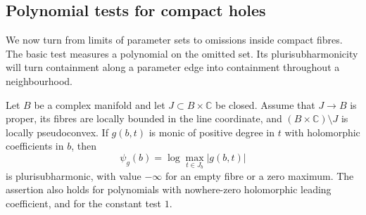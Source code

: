 \subsection{Polynomial tests for compact holes}

We now turn from limits of parameter sets to omissions inside compact
fibres. The basic test measures a polynomial on the omitted set.
Its plurisubharmonicity will turn containment along a parameter edge
into containment throughout a neighbourhood.

\begin{lemma}
\label{holes:polynomial-maximum}
Let $B$ be a complex manifold and let $J\subset B\times\mathbb C$
be closed. Assume that $J\to B$ is proper, its fibres are locally
bounded in the line coordinate, and $(B\times\mathbb C)\setminus J$
is locally pseudoconvex. If $g(b,t)$ is monic of positive degree in
$t$ with holomorphic coefficients in $b$, then
\[
 \psi_g(b)=\log\max_{t\in J_b}|g(b,t)|
\]
is plurisubharmonic, with value $-\infty$ for an empty fibre or a
zero maximum. The assertion also holds for polynomials with
nowhere-zero holomorphic leading coefficient, and for the constant
test $1$.
\end{lemma}

